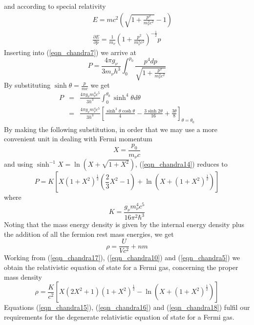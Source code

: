 and according to special relativity
\begin{eqnarray}
	&&E = mc^2\left(\sqrt{1+\frac{p^2}{m_\nu^2 c^2}}-1\right)
	\label{eqn_chandra11} \\
	&&\frac{\partial E}{\partial p} = \frac{1}{m_\nu} \left( 1 + \frac{p^2}{m_\nu^2c^2}\right)^{-\frac{1}{2}} p
	\label{eqn_chandra12}
\end{eqnarray}
Inserting into (\ref{eqn_chandra7}) we arrive at
\begin{equation}
	P = \frac{4\pi g_\nu}{3 m_\nu h^3} \int_0^{p_0} \frac{p^4 dp}{\sqrt{1+\frac{p^2}{m_\nu^2 c^2}}}
	\label{eqn_chandra13}
\end{equation}
By substituting $\sinh \theta = \frac{p}{mc}$ we get
\begin{eqnarray}
	P &=& \frac{4\pi g_\nu m_\nu^4c^5}{3h^3} \int_0^{\theta_0} \sinh^4 \theta d\theta \nonumber \\
	  &=& \frac{4\pi g_\nu m_\nu^4c^5}{3h^3} \left[ \frac{\sinh^3\theta \cosh \theta}{4} -\frac{3 \sinh 2\theta}{16} + \frac{3\theta}{8} \right]_{\theta = \theta_0}
	\label{eqn_chandra14}
\end{eqnarray}
By making the following substitution, in order that we may use a more convenient unit in dealing with Fermi momentum
\begin{equation}
	X=\frac{p_0}{m_\nu c}
	\label{eqn_relatfermibetterunits}
\end{equation}
and using $\sinh^{-1}X=\ln(X+\sqrt{1+X^2})$, (\ref{eqn_chandra14}) reduces to
\begin{equation}
	P = K \left[ X\left(1+X^2\right)^{\frac{1}{2}}\left(\frac{2}{3}X^2-1\right) + \ln \left(X+\left(1+X^2\right)^{\frac{1}{2}}\right)\right]
	\label{eqn_chandra15}
\end{equation}
where
\begin{equation}
	K = \frac{g_\nu m_\nu^4 c^5}{16\pi^2\hbar^3}
	\label{eqn_chandra16}
\end{equation}
Noting that the mass energy density is given by the internal energy density plus the addition of all the fermion rest mass energies, we get
\begin{equation}
	\rho = \frac{U}{Vc^2} + nm
	\label{eqn_chandra17}
\end{equation}
Working from (\ref{eqn_chandra17}), (\ref{eqn_chandra10}) and (\ref{eqn_chandra5}) we obtain the relativistic equation of state for
a Fermi gas, concerning the proper mass density
\begin{equation}
	\rho = \frac{K}{c^2}\left[X\left(2X^2+1\right)\left(1+X^2\right)^{\frac{1}{2}} - \ln \left( X+\left( 1+X^2\right)^{\frac{1}{2}}\right) \right]
	\label{eqn_chandra18}
\end{equation}
Equations (\ref{eqn_chandra15}), (\ref{eqn_chandra16}) and (\ref{eqn_chandra18}) fulfil our requirements for the degenerate relativistic
equation of state for a Fermi gas.

